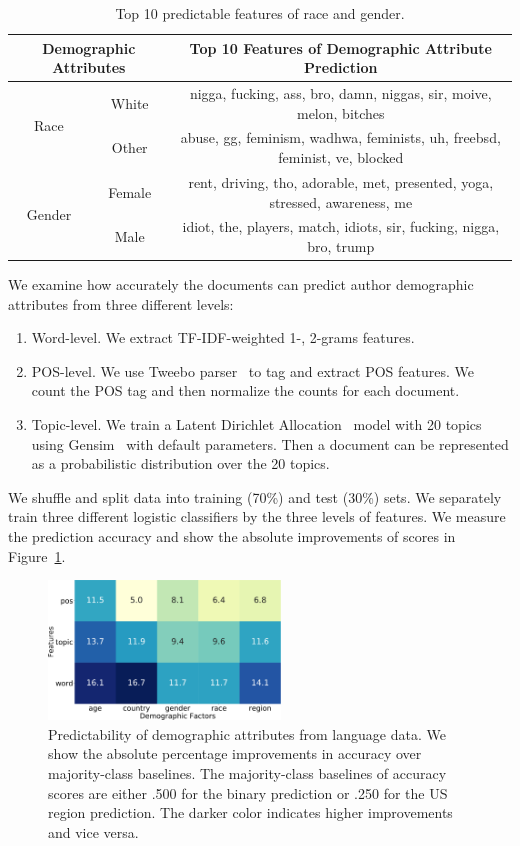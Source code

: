 \begin{table}[htp]
\centering
\begin{tabular}{cc||c}
\multicolumn{2}{c||}{Demographic Attributes} & Top 10 Features of Demographic Attribute Prediction \\\hline\hline
\multirow{2}{*}{Race} & White & nigga, fucking, ass, bro, damn, niggas, sir, moive, melon, bitches \\
 & Other & abuse, gg, feminism, wadhwa, feminists, uh, freebsd, feminist, ve, blocked \\\hline
\multirow{2}{*}{Gender} & Female & rent, driving, tho, adorable, met, presented, yoga, stressed, awareness, me \\
 & Male & idiot, the, players, match, idiots, sir, fucking, nigga, bro, trump
\end{tabular}
\caption{Top 10 predictable features of race and gender.}
\label{tab:features}
\end{table}

We examine how accurately the documents can predict author demographic attributes from three different levels:
\begin{enumerate}
    \item Word-level. We extract TF-IDF-weighted 1-, 2-grams features.
    \item POS-level. We use Tweebo parser~\cite{kong2014dependency} to tag and extract POS features. We count the POS tag and then normalize the counts for each document.
    \item Topic-level. We train a Latent Dirichlet Allocation~\cite{blei2003latent} model with 20 topics using Gensim~\cite{rehurek2010software} with default parameters. Then a document can be represented as a probabilistic distribution over the 20 topics.
\end{enumerate}

We shuffle and split data into training (70\%) and test (30\%) sets.
We separately train three different logistic classifiers by the three levels of features.
We measure the prediction accuracy and show the absolute improvements of scores in Figure~\ref{fig:predictability}.

\begin{figure}[htp]
\centering
\includegraphics[width=0.55\textwidth]{images/chapter5/predictability.pdf}
\caption{Predictability of demographic attributes from language
data. We show the absolute percentage improvements in accuracy over majority-class baselines. The majority-class baselines of accuracy scores are either .500 for the binary prediction or .250 for the US region prediction. The darker color indicates higher improvements and vice versa.}
\label{fig:predictability}
\end{figure}

